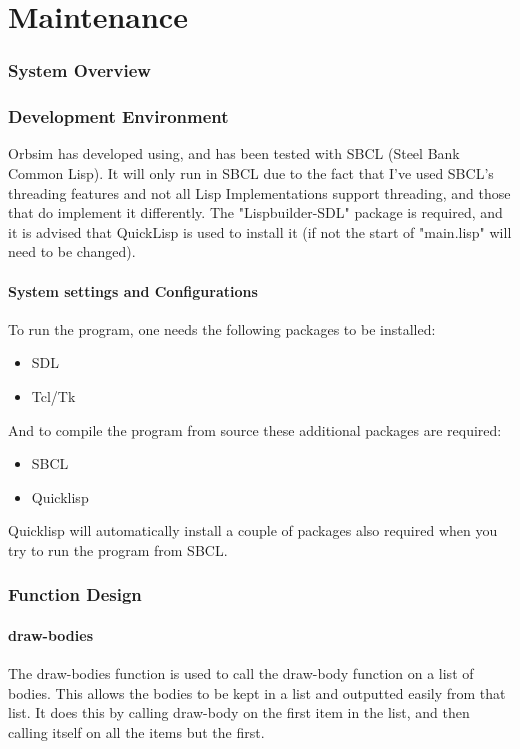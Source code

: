 \part{Maintenance}

\section{System Overview}

\section{Development Environment}
Orbsim has developed using, and has been tested with SBCL (Steel Bank Common
Lisp). It will only run in SBCL due to the fact that I've used SBCL's threading
features and not all Lisp Implementations support threading, and those that do
implement it differently. The "Lispbuilder-SDL" package is required, and it is
advised that QuickLisp is used to install it (if not the start of "main.lisp"
will need to be changed). 

\subsection{System settings and Configurations}
To run the program, one needs the following packages to be installed:
\begin{itemize}
	\item SDL
	\item Tcl/Tk
\end{itemize}
And to compile the program from source these additional packages are required:
\begin{itemize}
	\item SBCL
	\item Quicklisp	
\end{itemize}
Quicklisp will automatically install a couple of packages also required when you
try to run the program from SBCL.
\section{Function Design}

\subsection{draw-bodies}
The draw-bodies function is used to call the draw-body function on a list of
bodies. This allows the bodies to be kept in a list and outputted easily from
that list. It does this by calling draw-body on the first item in the list, and
then calling itself on all the items but the first.

